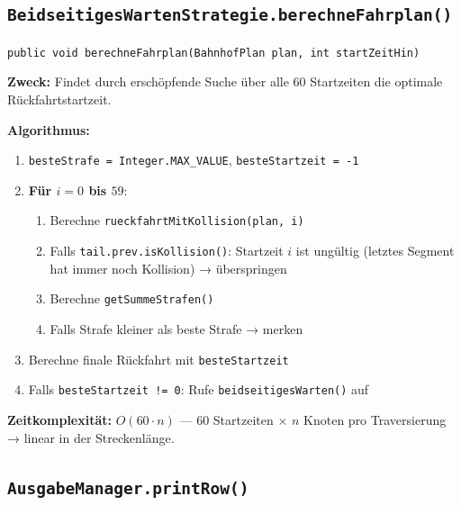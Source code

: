 \documentclass[12pt,a4paper]{article}
\begin{document}

\subsection{\texttt{BeidseitigesWartenStrategie.berechneFahrplan()}}

\begin{tcolorbox}[colback=gray!5, colframe=gray!40, title=Methodensignatur]
\texttt{public void berechneFahrplan(BahnhofPlan plan, int startZeitHin)}
\end{tcolorbox}

\textbf{Zweck:} Findet durch erschöpfende Suche über alle 60 Startzeiten die
optimale Rückfahrtstartzeit.

\textbf{Algorithmus:}

\begin{enumerate}
  \item \texttt{besteStrafe = Integer.MAX\_VALUE}, \texttt{besteStartzeit = -1}
  \item \textbf{Für $i = 0$ bis $59$}:
    \begin{enumerate}
      \item Berechne \texttt{rueckfahrtMitKollision(plan, i)}
      \item Falls \texttt{tail.prev.isKollision()}: Startzeit $i$ ist ungültig
            (letztes Segment hat immer noch Kollision) → überspringen
      \item Berechne \texttt{getSummeStrafen()}
      \item Falls Strafe kleiner als beste Strafe → merken
    \end{enumerate}
  \item Berechne finale Rückfahrt mit \texttt{besteStartzeit}
  \item Falls \texttt{besteStartzeit != 0}: Rufe \texttt{beidseitigesWarten()} auf
\end{enumerate}

\textbf{Zeitkomplexität:} $O(60 \cdot n)$ — 60 Startzeiten $\times$ $n$ Knoten
pro Traversierung → linear in der Streckenlänge.


\subsection{\texttt{AusgabeManager.printRow()}}
\end{document}
